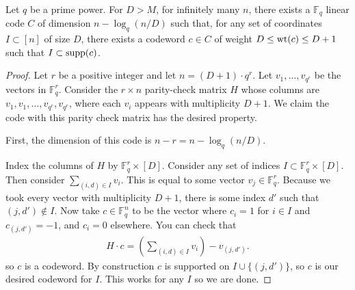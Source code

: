 \begin{theorem}
  Let $q$ be a prime power.
  For $D>M$, for infinitely many $n$, there exists a $\mathbb{F}_q$ linear code $C$ of dimension $n-\log_q(n/D)$ such that, for any set of coordinates $I\subset[n]$ of size $D$, there exists a codeword $c\in C$ of weight $D\le \operatorname*{wt}(c)\le D+1$ such that $I\subset \operatorname*{supp}(c)$.
  \label{}
\end{theorem}
\begin{proof}
  Let $r$ be a positive integer and let $n=(D+1)\cdot q^r$.
  Let $v_1,\dots,v_{q^r}$ be the vectors in $\mathbb{F}_q^r$.
  Consider the $r\times n$ parity-check matrix $H$ whose columns are $v_1,v_1,\dots,v_{q^r},v_{q^r}$, where each $v_i$ appears with multiplicity $D+1$.
  We claim the code with this parity check matrix has the desired property.

  First, the dimension of this code is $n-r = n-\log_q(n/D)$.

  Index the columns of $H$ by $\mathbb{F}_q^r\times [D]$.
  Consider any set of indices $I\subset \mathbb{F}_q^r\times [D]$.
  Then consider $\sum_{(i,d)\in I}^{} v_i$. This is equal to some vector $v_j\in\mathbb{F}_q^r$.
  Because we took every vector with multiplicity $D+1$, there is some index $d'$ such that $(j,d')\notin I$.
  Now take $c\in\mathbb{F}_q^n$ to be the vector where $c_i=1$ for $i\in I$ and $c_{(j,d')}=-1$, and $c_i=0$ elsewhere.
  You can check that
  \begin{align}
    H\cdot c = \left(\sum_{(i,d)\in I}^{} v_i\right)  - v_{(j,d')}.
    \label{}
  \end{align}
  so $c$ is a codeword. 
  By construction $c$ is supported on $I\cup \{(j,d')\}$, so $c$ is our desired codeword for $I$.
  This works for any $I$ so we are done.
\end{proof}
